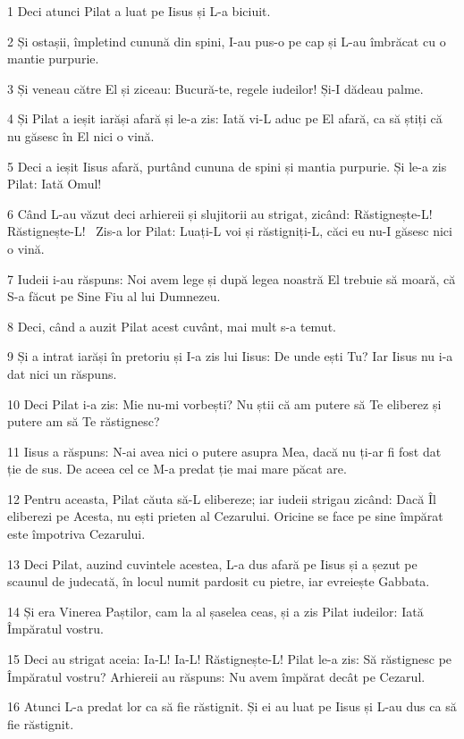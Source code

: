 \par 1 Deci atunci Pilat a luat pe Iisus și L-a biciuit.
\par 2 Și ostașii, împletind cunună din spini, I-au pus-o pe cap și L-au îmbrăcat cu o mantie purpurie.
\par 3 Și veneau către El și ziceau: Bucură-te, regele iudeilor! Și-I dădeau palme.
\par 4 Și Pilat a ieșit iarăși afară și le-a zis: Iată vi-L aduc pe El afară, ca să știți că nu găsesc în El nici o vină.
\par 5 Deci a ieșit Iisus afară, purtând cununa de spini și mantia purpurie. Și le-a zis Pilat: Iată Omul!
\par 6 Când L-au văzut deci arhiereii și slujitorii au strigat, zicând: Răstignește-L! Răstignește-L!  Zis-a lor Pilat: Luați-L voi și răstigniți-L, căci eu nu-I găsesc nici o vină.
\par 7 Iudeii i-au răspuns: Noi avem lege și după legea noastră El trebuie să moară, că S-a făcut pe Sine Fiu al lui Dumnezeu.
\par 8 Deci, când a auzit Pilat acest cuvânt, mai mult s-a temut.
\par 9 Și a intrat iarăși în pretoriu și I-a zis lui Iisus: De unde ești Tu? Iar Iisus nu i-a dat nici un răspuns.
\par 10 Deci Pilat i-a zis: Mie nu-mi vorbești? Nu știi că am putere să Te eliberez și putere am să Te răstignesc?
\par 11 Iisus a răspuns: N-ai avea nici o putere asupra Mea, dacă nu ți-ar fi fost dat ție de sus. De aceea cel ce M-a predat ție mai mare păcat are.
\par 12 Pentru aceasta, Pilat căuta să-L elibereze; iar iudeii strigau zicând: Dacă Îl eliberezi pe Acesta, nu ești prieten al Cezarului. Oricine se face pe sine împărat este împotriva Cezarului.
\par 13 Deci Pilat, auzind cuvintele acestea, L-a dus afară pe Iisus și a șezut pe scaunul de judecată, în locul numit pardosit cu pietre, iar evreiește Gabbata.
\par 14 Și era Vinerea Paștilor, cam la al șaselea ceas, și a zis Pilat iudeilor: Iată Împăratul vostru.
\par 15 Deci au strigat aceia: Ia-L! Ia-L! Răstignește-L! Pilat le-a zis: Să răstignesc pe Împăratul vostru? Arhiereii au răspuns: Nu avem împărat decât pe Cezarul.
\par 16 Atunci L-a predat lor ca să fie răstignit. Și ei au luat pe Iisus și L-au dus ca să fie răstignit.
